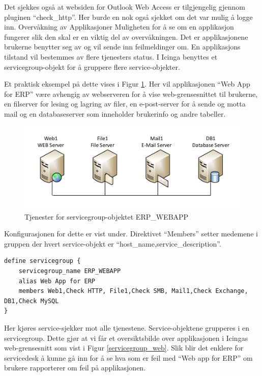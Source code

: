 Det sjekkes også at websiden for Outlook Web Access er tilgjengelig gjennom pluginen “check\_http”. Her burde en nok også sjekket om det var mulig å logge inn.
Overvåkning av Applikasjoner
Muligheten for å se om en applikasjon fungerer slik den skal er en viktig del av overvåkningen. Det er applikasjonene brukerne benytter seg av og vil sende inn feilmeldinger om. En applikasjons tilstand vil bestemmes av flere tjenesters status. I Icinga benyttes et servicegroup-objekt for å gruppere flere service-objekter.

Et praktisk eksempel på dette vises i Figur \ref{servicegroup_layout}. Her vil applikasjonen “Web App for ERP” være avhengig av webserveren for å vise web-grensesnittet til brukerne, en filserver for lesing og lagring av filer, en e-post-server for å sende og motta mail og en databaseserver som inneholder brukerinfo og andre tabeller. 

\begin{figure}
    \centering
    \includegraphics[scale=0.6]{img/servicegroup_layout}
    \caption{Tjenester for servicegroup-objektet  ERP\_WEBAPP}
    \label{servicegroup_layout}
\end{figure}


Konfigurasjonen for dette er vist under. Direktivet “Members” setter medemene i gruppen der hvert service-objekt er “host\_name,service\_description”.

\begin{lstlisting}
define servicegroup {
	servicegroup_name ERP_WEBAPP
	alias Web App for ERP
	members Web1,Check HTTP, File1,Check SMB, Mail1,Check Exchange, DB1,Check MySQL
}
\end{lstlisting}


Her kjøres service-sjekker mot alle tjenestene. Service-objektene grupperes i en servicegroup. 
Dette gjør at vi får et oversiktsbilde over applikasjonen i Icingas web-grensesnitt som vist i Figur \ref{servicegroup_web}. Slik blir det enklere for servicedesk å kunne gå inn for å se hva som er feil med “Web app for ERP” om brukere rapporterer om feil på applikasjonen.


